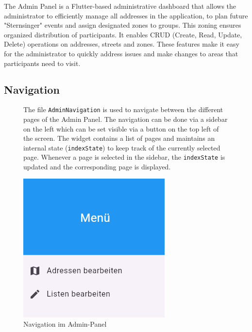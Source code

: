 \Author{\daAuthorOne}


The Admin Panel is a Flutter-based administrative dashboard that allows the administrator to efficiently manage all addresses in the application, to plan  future "Sternsinger" events and assign designated zones to groups. This zoning ensures organized distribution of participants. It enables CRUD (Create, Read, Update, Delete) operations on addresses, streets and zones. These features make it easy for the administrator to quickly address issues and make changes to areas that participants need to visit.

\subsection{Navigation}

\noindent

\begin{figure}[H]

\begin{minipage}{0.58\textwidth}
    The file \texttt{AdminNavigation} is used to navigate between the different pages of the Admin Panel. The navigation can be done via a sidebar on the left which can be set visible via a button on the top left of the screen. The widget contains a list of pages and maintains an internal state (\texttt{indexState}) to keep track of the currently selected page. Whenever a page is selected in the sidebar, the \texttt{indexState} is updated and the corresponding page is displayed.
    \end{minipage}
    \hfill
    \begin{minipage}{0.38\textwidth}
    \centering
    \includegraphics[width=0.7\linewidth]{images/AdminPanel/Menu.png}
    \caption{Navigation im Admin-Panel}
    \label{fig:adminpanel_navigation}
\end{minipage}

\end{figure}




